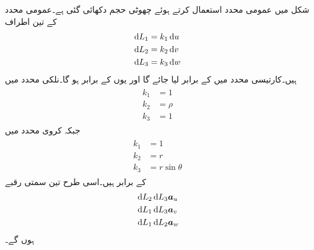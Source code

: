 شکل میں عمومی محدد استعمال کرتے ہوئے چھوٹی حجم دکھائی گئی ہے۔عمومی محدد کے تین اطراف
\begin{align*}
\dif L_1 &= k_1 \dif u \\
\dif L_2 &= k_2 \dif v \\
\dif L_3 &= k_3 \dif w 
\end{align*}
ہیں۔کارتیسی محدد میں  کے برابر لیا جائے گا اور یوں  کے برابر ہو گا۔نلکی محدد میں
\begin{gather}
\begin{aligned}\label{مساوات_گاؤس_نلکی_اطراف_کے_مستقل}
k_1&=1\\
k_2&=\rho\\
k_3&=1
\end{aligned}
\end{gather}
جبکہ کروی محدد میں
\begin{gather}
\begin{aligned}\label{مساوات_گاؤس_کروی_اطراف_کے_مستقل}
k_1&=1\\
k_2&=r\\
k_3&=r \sin \theta
\end{aligned}
\end{gather}
کے برابر ہیں۔اسی طرح تین سمتی رقبے
\begin{align*}
& \dif L_2 \dif L_3 \au\\
&\dif L_1 \dif L_3 \av\\
&\dif L_1 \dif L_2 \aw
\end{align*}
ہوں گے۔

